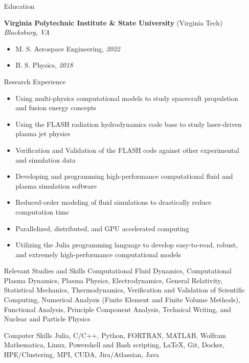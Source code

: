 \documentclass{resume} %
\begin{document}
\begin{rSection}{Education}

    \textbf{Virginia Polytechnic Institute & State University} (Virginia Tech) \hfill \textit{Blacksburg, VA}
     \begin{itemize}
        \itemsep -3pt {} 
         \item M. S. Aerospace Engineering, \textit{2022}
         \item B. S. Physics, \textit{2018}
     \end{itemize}


\end{rSection}

\begin{rSection}{Research Experience}
    \begin{itemize}
        \itemsep -3pt {}
        \item Using multi-physics computational models to study spacecraft propulstion and fusion energy concepts
        \item Using the FLASH radiation hydrodynamics code base to study laser-driven plasma jet physics
        \item Verification and Validation of the FLASH code against other experimental and simulation data
        \item Developing and programming high-performance computational fluid and plasma simulation software
        \item Reduced-order modeling of fluid simulations to drastically reduce computation time
        \item Parallelized, distributed, and GPU accelerated computing
        \item Utilizing the Julia programming language to develop easy-to-read, robust, and extremely high-performance computational models
    \end{itemize}
\end{rSection}

\begin{rSection}{Relevant Studies and Skills}
    Computational Fluid Dynamics, Computational Plasma Dynamics, Plasma Physics, Electrodynamics, General Relativity, Statistical Mechanics, Thermodynamics, Verification and Validation of Scientific Computing, Numerical Analysis (Finite Element and Finite Volume Methods), Functional Analysis, Principle Component Analysis, Technical Writing, and Nuclear and Particle Physics
\end{rSection}

\begin{rSection}{Computer Skills}
    Julia, C/C++, Python, FORTRAN, MATLAB, Wolfram Mathematica, Linux, Powershell and Bash scripting, LaTeX, Git, Docker, HPE/Clustering, MPI, CUDA, Jira/Atlassian, Java
\end{rSection}
\end{document}
